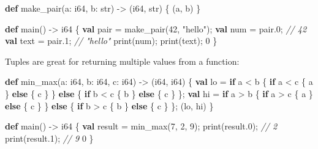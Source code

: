 \documentclass[
  english,
]{book}
\newenvironment{Shaded}{\begin{snugshade}}{\end{snugshade}}
\newcommand{\CommentTok}[1]{\textcolor[rgb]{0.42,0.60,0.33}{\textit{#1}}}
\newcommand{\ControlFlowTok}[1]{\textcolor[rgb]{0.77,0.53,0.75}{\textbf{#1}}}
\newcommand{\DataTypeTok}[1]{\textcolor[rgb]{0.31,0.79,0.69}{#1}}
\newcommand{\DecValTok}[1]{\textcolor[rgb]{0.71,0.81,0.66}{#1}}
\newcommand{\FunctionTok}[1]{\textcolor[rgb]{0.86,0.86,0.67}{#1}}
\newcommand{\KeywordTok}[1]{\textcolor[rgb]{0.34,0.61,0.84}{\textbf{#1}}}
\newcommand{\NormalTok}[1]{\textcolor[rgb]{0.83,0.83,0.83}{#1}}
\newcommand{\OperatorTok}[1]{\textcolor[rgb]{0.83,0.83,0.83}{#1}}
\newcommand{\StringTok}[1]{\textcolor[rgb]{0.81,0.57,0.47}{#1}}
\begin{document}
\begin{Shaded}
\begin{Highlighting}[]
\KeywordTok{def}\NormalTok{ make\_pair(a: }\DataTypeTok{i64}\NormalTok{, b: }\DataTypeTok{str}\NormalTok{) }\OperatorTok{{-}\textgreater{}}\NormalTok{ (}\DataTypeTok{i64}\NormalTok{, }\DataTypeTok{str}\NormalTok{) \{}
\NormalTok{    (a, b)}
\NormalTok{\}}

\KeywordTok{def}\NormalTok{ main() }\OperatorTok{{-}\textgreater{}} \DataTypeTok{i64}\NormalTok{ \{}
    \KeywordTok{val}\NormalTok{ pair }\OperatorTok{=}\NormalTok{ make\_pair(}\DecValTok{42}\NormalTok{, }\StringTok{"hello"}\NormalTok{);}
    \KeywordTok{val}\NormalTok{ num }\OperatorTok{=}\NormalTok{ pair}\OperatorTok{.}\DecValTok{0}\NormalTok{;   }\CommentTok{// 42}
    \KeywordTok{val}\NormalTok{ text }\OperatorTok{=}\NormalTok{ pair}\OperatorTok{.}\DecValTok{1}\NormalTok{;  }\CommentTok{// "hello"}
    \FunctionTok{print}\NormalTok{(num);}
    \FunctionTok{print}\NormalTok{(text);}
    \DecValTok{0}
\NormalTok{\}}
\end{Highlighting}
\end{Shaded}

Tuples are great for returning multiple values from a function:

\begin{Shaded}
\begin{Highlighting}[]
\KeywordTok{def}\NormalTok{ min\_max(a: }\DataTypeTok{i64}\NormalTok{, b: }\DataTypeTok{i64}\NormalTok{, c: }\DataTypeTok{i64}\NormalTok{) }\OperatorTok{{-}\textgreater{}}\NormalTok{ (}\DataTypeTok{i64}\NormalTok{, }\DataTypeTok{i64}\NormalTok{) \{}
    \KeywordTok{val}\NormalTok{ lo }\OperatorTok{=} \ControlFlowTok{if}\NormalTok{ a }\OperatorTok{\textless{}}\NormalTok{ b \{ }\ControlFlowTok{if}\NormalTok{ a }\OperatorTok{\textless{}}\NormalTok{ c \{ a \} }\ControlFlowTok{else}\NormalTok{ \{ c \} \} }\ControlFlowTok{else}\NormalTok{ \{ }\ControlFlowTok{if}\NormalTok{ b }\OperatorTok{\textless{}}\NormalTok{ c \{ b \} }\ControlFlowTok{else}\NormalTok{ \{ c \} \};}
    \KeywordTok{val}\NormalTok{ hi }\OperatorTok{=} \ControlFlowTok{if}\NormalTok{ a }\OperatorTok{\textgreater{}}\NormalTok{ b \{ }\ControlFlowTok{if}\NormalTok{ a }\OperatorTok{\textgreater{}}\NormalTok{ c \{ a \} }\ControlFlowTok{else}\NormalTok{ \{ c \} \} }\ControlFlowTok{else}\NormalTok{ \{ }\ControlFlowTok{if}\NormalTok{ b }\OperatorTok{\textgreater{}}\NormalTok{ c \{ b \} }\ControlFlowTok{else}\NormalTok{ \{ c \} \};}
\NormalTok{    (lo, hi)}
\NormalTok{\}}

\KeywordTok{def}\NormalTok{ main() }\OperatorTok{{-}\textgreater{}} \DataTypeTok{i64}\NormalTok{ \{}
    \KeywordTok{val} \DataTypeTok{result} \OperatorTok{=}\NormalTok{ min\_max(}\DecValTok{7}\NormalTok{, }\DecValTok{2}\NormalTok{, }\DecValTok{9}\NormalTok{);}
    \FunctionTok{print}\NormalTok{(}\DataTypeTok{result}\OperatorTok{.}\DecValTok{0}\NormalTok{);   }\CommentTok{// 2}
    \FunctionTok{print}\NormalTok{(}\DataTypeTok{result}\OperatorTok{.}\DecValTok{1}\NormalTok{);   }\CommentTok{// 9}
    \DecValTok{0}
\NormalTok{\}}
\end{Highlighting}
\end{Shaded}
\end{document}
